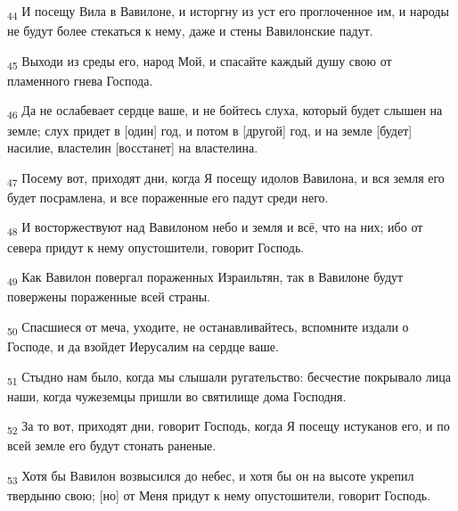\begin{tcolorbox}
\textsubscript{44} И посещу Вила в Вавилоне, и исторгну из уст его проглоченное им, и народы не будут более стекаться к нему, даже и стены Вавилонские падут.
\end{tcolorbox}
\begin{tcolorbox}
\textsubscript{45} Выходи из среды его, народ Мой, и спасайте каждый душу свою от пламенного гнева Господа.
\end{tcolorbox}
\begin{tcolorbox}
\textsubscript{46} Да не ослабевает сердце ваше, и не бойтесь слуха, который будет слышен на земле; слух придет в [один] год, и потом в [другой] год, и на земле [будет] насилие, властелин [восстанет] на властелина.
\end{tcolorbox}
\begin{tcolorbox}
\textsubscript{47} Посему вот, приходят дни, когда Я посещу идолов Вавилона, и вся земля его будет посрамлена, и все пораженные его падут среди него.
\end{tcolorbox}
\begin{tcolorbox}
\textsubscript{48} И восторжествуют над Вавилоном небо и земля и всё, что на них; ибо от севера придут к нему опустошители, говорит Господь.
\end{tcolorbox}
\begin{tcolorbox}
\textsubscript{49} Как Вавилон повергал пораженных Израильтян, так в Вавилоне будут повержены пораженные всей страны.
\end{tcolorbox}
\begin{tcolorbox}
\textsubscript{50} Спасшиеся от меча, уходите, не останавливайтесь, вспомните издали о Господе, и да взойдет Иерусалим на сердце ваше.
\end{tcolorbox}
\begin{tcolorbox}
\textsubscript{51} Стыдно нам было, когда мы слышали ругательство: бесчестие покрывало лица наши, когда чужеземцы пришли во святилище дома Господня.
\end{tcolorbox}
\begin{tcolorbox}
\textsubscript{52} За то вот, приходят дни, говорит Господь, когда Я посещу истуканов его, и по всей земле его будут стонать раненые.
\end{tcolorbox}
\begin{tcolorbox}
\textsubscript{53} Хотя бы Вавилон возвысился до небес, и хотя бы он на высоте укрепил твердыню свою; [но] от Меня придут к нему опустошители, говорит Господь.
\end{tcolorbox}
